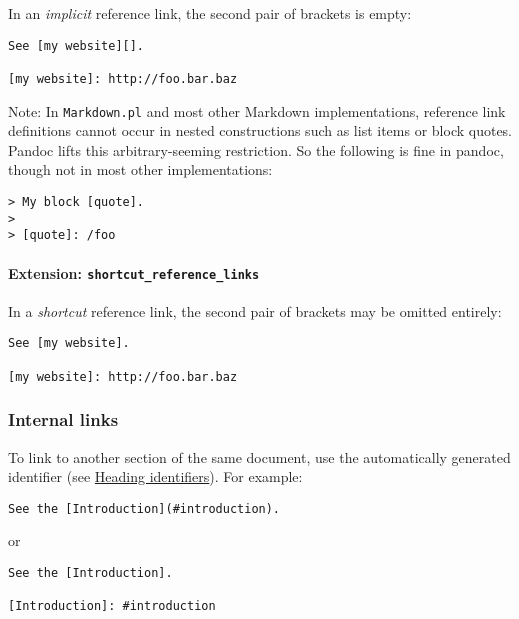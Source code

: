 \documentclass[
]{article}
\begin{document}
In an \emph{implicit} reference link, the second pair of brackets is
empty:

\begin{verbatim}
See [my website][].

[my website]: http://foo.bar.baz
\end{verbatim}

Note: In \texttt{Markdown.pl} and most other Markdown implementations,
reference link definitions cannot occur in nested constructions such as
list items or block quotes. Pandoc lifts this arbitrary-seeming
restriction. So the following is fine in pandoc, though not in most
other implementations:

\begin{verbatim}
> My block [quote].
>
> [quote]: /foo
\end{verbatim}

\hypertarget{extension-shortcut_reference_links}{%
\paragraph{\texorpdfstring{Extension:
\texttt{shortcut\_reference\_links}}{Extension: shortcut\_reference\_links}}\label{extension-shortcut_reference_links}}

In a \emph{shortcut} reference link, the second pair of brackets may be
omitted entirely:

\begin{verbatim}
See [my website].

[my website]: http://foo.bar.baz
\end{verbatim}

\hypertarget{internal-links}{%
\subsubsection{Internal links}\label{internal-links}}

To link to another section of the same document, use the automatically
generated identifier (see
\protect\hyperlink{heading-identifiers}{Heading identifiers}). For
example:

\begin{verbatim}
See the [Introduction](#introduction).
\end{verbatim}

or

\begin{verbatim}
See the [Introduction].

[Introduction]: #introduction
\end{verbatim}
\end{document}
